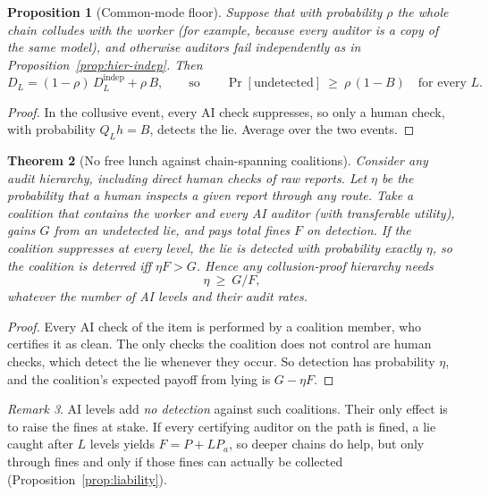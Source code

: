 \documentclass[11pt]{article}
\newtheorem{theorem}{Theorem}
\newtheorem{proposition}[theorem]{Proposition}
\theoremstyle{definition}
\theoremstyle{remark}
\newtheorem{remark}[theorem]{Remark}
\newcommand{\1}{\mathbf{1}}
\begin{document}
\begin{proposition}[Common-mode floor]\label{prop:hier-floor}
Suppose that with probability $\rho$ the whole chain colludes with the worker (for
example, because every auditor is a copy of the same model), and otherwise auditors fail
independently as in Proposition~\ref{prop:hier-indep}. Then
\[
D_L=(1-\rho)\,D_L^{\text{indep}}+\rho\,B,\qquad\text{so}\qquad
\Pr[\text{undetected}]\ \ge\ \rho\,(1-B)\quad\text{for every }L .
\]
\end{proposition}

\begin{proof}
In the collusive event, every AI check suppresses, so only a human check, with
probability $Q_Lh=B$, detects the lie. Average over the two events.
\end{proof}

\begin{theorem}[No free lunch against chain-spanning coalitions]\label{thm:hier-nofree}
Consider any audit hierarchy, including direct human checks of raw reports. Let $\eta$ be
the probability that a human inspects a given report through any route. Take a coalition
that contains the worker and every AI auditor (with transferable utility), gains $G$ from
an undetected lie, and pays total fines $F$ on detection. If the coalition suppresses at
every level, the lie is detected with probability exactly $\eta$, so the coalition is
deterred iff $\eta F>G$. Hence any collusion-proof hierarchy needs
\[
\eta\ \ge\ G/F ,
\]
whatever the number of AI levels and their audit rates.
\end{theorem}

\begin{proof}
Every AI check of the item is performed by a coalition member, who certifies it as
clean. The only checks the coalition does not control are human checks, which detect the
lie whenever they occur. So detection has probability $\eta$, and the coalition's
expected payoff from lying is $G-\eta F$.
\end{proof}

\begin{remark}
AI levels add \emph{no detection} against such coalitions. Their only effect is to raise
the fines at stake. If every certifying auditor on the path is fined, a lie caught after
$L$ levels yields $F=P+LP_a$, so deeper chains do help, but only through fines and only if
those fines can actually be collected (Proposition~\ref{prop:liability}).
\end{remark}
\end{document}
